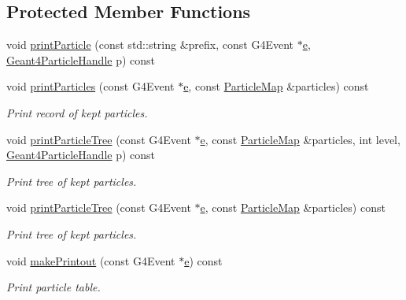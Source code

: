 \subsection*{Protected Member Functions}
\begin{DoxyCompactItemize}
\item 
void \hyperlink{class_d_d4hep_1_1_simulation_1_1_geant4_particle_print_ab83c88cd1661b1568e5e9669453edaa4}{print\+Particle} (const std\+::string \&prefix, const G4\+Event $\ast$\hyperlink{_volumes_8cpp_a8a9a1f93e9b09afccaec215310e64142}{e}, \hyperlink{class_d_d4hep_1_1_simulation_1_1_geant4_particle_handle}{Geant4\+Particle\+Handle} p) const
\item 
void \hyperlink{class_d_d4hep_1_1_simulation_1_1_geant4_particle_print_ab1cca2970424ee0ae8107e0ff49cd2d8}{print\+Particles} (const G4\+Event $\ast$\hyperlink{_volumes_8cpp_a8a9a1f93e9b09afccaec215310e64142}{e}, const \hyperlink{class_d_d4hep_1_1_simulation_1_1_geant4_particle_print_a1c6a9ccb9393484ee16c7cd344e20f4a}{Particle\+Map} \&particles) const
\begin{DoxyCompactList}\small\item\em Print record of kept particles. \end{DoxyCompactList}\item 
void \hyperlink{class_d_d4hep_1_1_simulation_1_1_geant4_particle_print_ab614646d1d451ef3fe9aa15856a74b8d}{print\+Particle\+Tree} (const G4\+Event $\ast$\hyperlink{_volumes_8cpp_a8a9a1f93e9b09afccaec215310e64142}{e}, const \hyperlink{class_d_d4hep_1_1_simulation_1_1_geant4_particle_print_a1c6a9ccb9393484ee16c7cd344e20f4a}{Particle\+Map} \&particles, int level, \hyperlink{class_d_d4hep_1_1_simulation_1_1_geant4_particle_handle}{Geant4\+Particle\+Handle} p) const
\begin{DoxyCompactList}\small\item\em Print tree of kept particles. \end{DoxyCompactList}\item 
void \hyperlink{class_d_d4hep_1_1_simulation_1_1_geant4_particle_print_a8582a12abba60c9183278b37219599fc}{print\+Particle\+Tree} (const G4\+Event $\ast$\hyperlink{_volumes_8cpp_a8a9a1f93e9b09afccaec215310e64142}{e}, const \hyperlink{class_d_d4hep_1_1_simulation_1_1_geant4_particle_print_a1c6a9ccb9393484ee16c7cd344e20f4a}{Particle\+Map} \&particles) const
\begin{DoxyCompactList}\small\item\em Print tree of kept particles. \end{DoxyCompactList}\item 
void \hyperlink{class_d_d4hep_1_1_simulation_1_1_geant4_particle_print_a13e9455a1d1401c9843c2e8e6e911a9a}{make\+Printout} (const G4\+Event $\ast$\hyperlink{_volumes_8cpp_a8a9a1f93e9b09afccaec215310e64142}{e}) const
\begin{DoxyCompactList}\small\item\em Print particle table. \end{DoxyCompactList}\end{DoxyCompactItemize}
